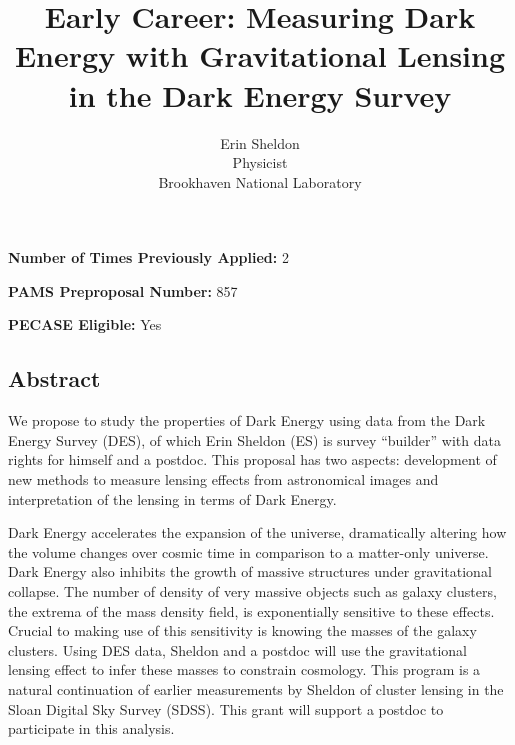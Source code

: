 \documentclass[12pt]{article}
\begin{document}
\vspace{3mm}
\noindent
{\bf Number of Times Previously Applied:} 2

\vspace{3mm}
\noindent
{\bf PAMS Preproposal Number:} 857


\vspace{3mm}
\noindent
{\bf PECASE Eligible:} Yes



\newpage

\tableofcontents

\newpage

\title{Early Career: Measuring Dark Energy with Gravitational Lensing in 
the Dark Energy Survey}
\author{Erin Sheldon\\
{\normalsize Physicist}\\
\normalsize{Brookhaven National Laboratory}}
\date{}
\maketitle

\setcounter{page}{1}
\begin{center}
\section*{Abstract}
\end{center}

We propose to study the properties of Dark Energy using data from the Dark
Energy Survey (DES), of which Erin Sheldon (ES) is survey ``builder'' with data
rights for himself and a postdoc.  This proposal has two aspects: development
of new methods to measure lensing effects from astronomical images and
interpretation of the lensing in terms of Dark Energy.

Dark Energy accelerates the expansion of the universe, dramatically altering
how the volume changes over cosmic time in comparison to a matter-only
universe.  Dark Energy also inhibits the growth of massive structures under
gravitational collapse.  The number of density of very massive objects such as
galaxy clusters, the extrema of the mass density field, is exponentially
sensitive to these effects.  Crucial to making use of this sensitivity is
knowing the masses of the galaxy clusters.  Using DES data, Sheldon and a
postdoc will use the gravitational lensing effect to infer these masses to
constrain cosmology.  This program is a natural continuation of earlier
measurements by Sheldon of cluster lensing in the Sloan Digital Sky Survey
(SDSS).  This grant will support a postdoc to participate in this analysis.
\end{document}
